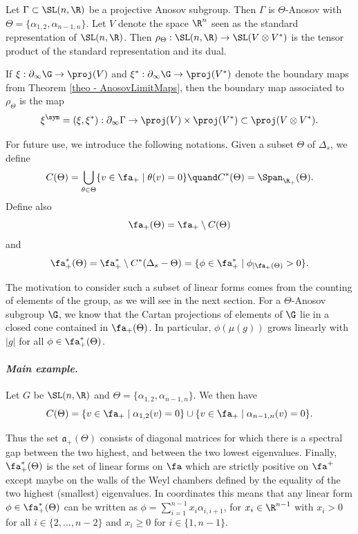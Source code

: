 \begin{example} \label{example - Symmetric boundary map}
Let $\Gamma \subset \SL(n,\R)$ be a projective Anosov subgroup. Then $\Gamma$ is $\Theta$\nobreakdash-Anosov with $\Theta = \{\alpha_{1,2}, \alpha_{n-1,n}\}$. Let $V$ denote the space $\R^n$ seen as the standard representation of $\SL(n,\R)$. Then $\rho_\Theta: \SL(n,\R) \to \SL(V\otimes V^*)$ is the tensor product of the standard representation and its dual.

If $\xi:\partial_\infty \G \to \proj (V)$ and $\xi^*:\partial_\infty \G \to \proj(V^*)$ denote the boundary maps from Theorem \ref{theo - AnosovLimitMaps}, then the boundary map associated to $\rho_\Theta$ is the map
\[\xi^{\sym} = (\xi, \xi^*): \partial_\infty \Gamma \to \proj(V)\times \proj(V^*) \subset \proj(V\otimes V^*).\]
\end{example}

For future use, we introduce the following notations. Given a subset $\Theta$ of $\Delta_s$, we define
\[C(\Theta) = \bigcup_{\theta \in \Theta}\{v\in \fa_+ \mid \theta(v) = 0\}\quand
C^*(\Theta) = \Span_{\R_+}(\Theta).\]
Define also
\[\fa_+(\Theta) = \fa_+ \setminus C(\Theta)\]
and
\[\fa_+^*(\Theta) = \fa_+^* \setminus C^*(\Delta_s -\Theta) = \{\phi \in \fa_+^*\mid \phi_{\vert \fa_+(\Theta)} >0\}.\]

\begin{rmk}
The motivation to consider such a subset of linear forms comes from the counting of elements of the group, as we will see in the next section. For a $\Theta$\nobreakdash-Anosov subgroup $\G$, we know that the Cartan projections of elements of $\G$ lie in a closed cone contained in $\fa_+(\Theta)$. In particular, $\phi(\mu(g))$ grows linearly with $|g|$ for all $\phi\in\fa_+^*(\Theta)$.
\end{rmk}

\paragraph{{\it Main example.}} Let $G$ be $\SL(n,\R)$ and $\Theta = \{\alpha_{1,2}, \alpha_{n-1,n}\}$. We then have
\[C(\Theta) = \{v\in \fa_+\mid \alpha_{1,2} (v) = 0 \}\cup \{v\in \fa_+\mid \alpha_{n-1,n} (v) = 0 \}.\]

Thus the set $\mathfrak{a}_+(\Theta)$ consists of diagonal matrices for which there is a spectral gap between the two highest, and between the two lowest eigenvalues.
Finally, $\fa_+^*(\Theta)$ is the set of linear forms on $\fa$ which are strictly positive on $\fa^+$ except maybe on the walls of the Weyl chambers defined by the equality of the two highest (\resp smallest) eigenvalues. In coordinates this means that any linear form $\phi\in \fa_+^*(\Theta)$ can be written as $\phi= \sum_{i=1}^{n-1} x_i \alpha_{i,i+1}$, for $x_i \in \R^{n-1}$ with $x_i> 0$ for all $i \in \{ 2, \dots, n-2\}$ and $x_i\geq 0$ for $i\in \{ 1, n-1\}$.

